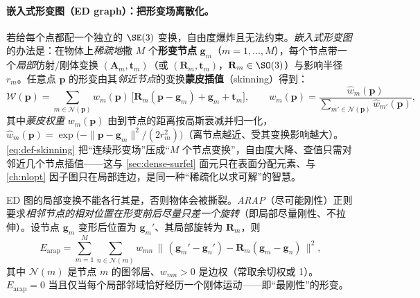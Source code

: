 \paragraph{嵌入式形变图（ED graph）：把形变场离散化。}
若给每个点都配一个独立的 $\SE(3)$ 变换，自由度爆炸且无法约束。\emph{嵌入式形变图}\cite{sumner2007embedded} 的办法是：在物体上\emph{稀疏地}撒 $M$ 个\textbf{形变节点} $\mathbf{g}_m$（$m=1,\dots,M$），每个节点带一个\emph{局部}仿射/刚体变换 $(\mathbf{A}_m,\mathbf{t}_m)$（或 $(\mathbf{R}_m,\mathbf{t}_m)$，$\mathbf{R}_m\in\SO(3)$）与影响半径 $r_m$。任意点 $\mathbf{p}$ 的形变由其\emph{邻近节点}的变换\textbf{蒙皮插值}（skinning）得到：
\begin{equation}
  \mathcal{W}(\mathbf{p})=\sum_{m\in\mathcal{N}(\mathbf{p})} w_m(\mathbf{p})\,\big[\mathbf{R}_m(\mathbf{p}-\mathbf{g}_m)+\mathbf{g}_m+\mathbf{t}_m\big],
  \qquad
  w_m(\mathbf{p})=\frac{\hat w_m(\mathbf{p})}{\sum_{m'\in\mathcal{N}(\mathbf{p})}\hat w_{m'}(\mathbf{p})},
  \label{eq:def-skinning}
\end{equation}
其中\emph{蒙皮权重} $w_m(\mathbf{p})$ 由到节点的距离按高斯衰减并归一化，$\hat w_m(\mathbf{p})=\exp\!\big(-\|\mathbf{p}-\mathbf{g}_m\|^2/(2 r_m^2)\big)$（离节点越近、受其变换影响越大）。\cref{eq:def-skinning} 把“连续形变场”压成“$M$ 个节点变换”，自由度大降、查值只需对邻近几个节点插值——这与 \cref{sec:dense-surfel} 面元只在表面分配元素、与 \cref{ch:nlopt} 因子图只在局部连边，是同一种“稀疏化以求可解”的智慧。

\begin{definition}\label{def:dyn-arap}
ED 图的局部变换不能各行其是，否则物体会被撕裂。\emph{ARAP}（尽可能刚性）正则\cite{sorkine2007arap} 要求\emph{相邻节点的相对位置在形变前后尽量只差一个旋转}（即局部尽量刚性、不拉伸）。设节点 $\mathbf{g}_m$ 变形后位置为 $\mathbf{g}_m'$、其局部旋转为 $\mathbf{R}_m$，则
\begin{equation}
  E_{\mathrm{arap}}
  =\sum_{m=1}^{M}\sum_{n\in\mathcal{N}(m)} w_{mn}\,
  \big\|\,(\mathbf{g}_m'-\mathbf{g}_n')-\mathbf{R}_m(\mathbf{g}_m-\mathbf{g}_n)\,\big\|^2,
  \label{eq:def-arap}
\end{equation}
其中 $\mathcal{N}(m)$ 是节点 $m$ 的图邻居、$w_{mn}>0$ 是边权（常取余切权或 1）。$E_{\mathrm{arap}}=0$ 当且仅当每个局部邻域恰好经历一个刚体运动——即“最刚性”的形变。
\end{definition}

